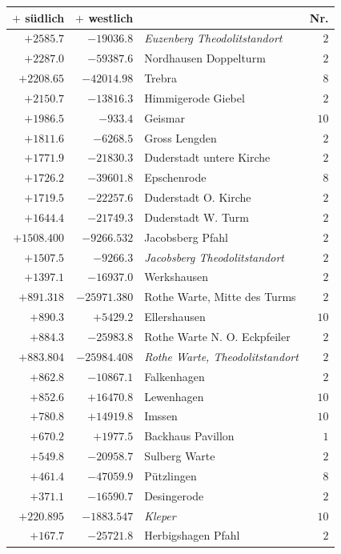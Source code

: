 \begin{center}\begingroup\fontsize{8}{9}\selectfont
\setlength{\tabcolsep}{4pt}
\begin{tabular}{r|r|p{170pt}|r}\hline
\(+\) südlich&\(+\) westlich&&Nr.\\\hline
\(+2585.7\)&\(-19036.8\)&\textit{Euzenberg Theodolitstandort}&\(2\)\\
\(+2287.0\)&\(-59387.6\)&Nordhausen Doppelturm&\(2\)\\
\(+2208.65\)&\(-42014.98\)&Trebra&\(8\)\\
\(+2150.7\)&\(-13816.3\)&Himmigerode Giebel&\(2\)\\
\(+1986.5\)&\(-933.4\)&Geismar&\(10\)\\
\(+1811.6\)&\(-6268.5\)&Gross Lengden&\(2\)\\
\(+1771.9\)&\(-21830.3\)&Duderstadt untere Kirche&\(2\)\\
\(+1726.2\)&\(-39601.8\)&Epschenrode&\(8\)\\
\(+1719.5\)&\(-22257.6\)&Duderstadt O. Kirche&\(2\)\\
\(+1644.4\)&\(-21749.3\)&Duderstadt W. Turm&\(2\)\\
\(+1508.400\)&\(-9266.532\)&Jacobsberg Pfahl&\(2\)\\
\(+1507.5\)&\(-9266.3\)&\textit{Jacobsberg Theodolitstandort}&\(2\)\\
\(+1397.1\)&\(-16937.0\)&Werkshausen&\(2\)\\
\(+891.318\)&\(-25971.380\)&Rothe Warte, Mitte des Turms&\(2\)\\
\(+890.3\)&\(+5429.2\)&Ellershausen&\(10\)\\
\(+884.3\)&\(-25983.8\)&Rothe Warte N. O. Eckpfeiler&\(2\)\\
\(+883.804\)&\(-25984.408\)&\textit{Rothe Warte, Theodolitstandort}&\(2\)\\
\(+862.8\)&\(-10867.1\)&Falkenhagen&\(2\)\\
\(+852.6\)&\(+16470.8\)&Lewenhagen&\(10\)\\
\(+780.8\)&\(+14919.8\)&Imssen&\(10\)\\
\(+670.2\)&\(+1977.5\)&Backhaus Pavillon&\(1\)\\
\(+549.8\)&\(-20958.7\)&Sulberg Warte&\(2\)\\
\(+461.4\)&\(-47059.9\)&Pützlingen&\(8\)\\
\(+371.1\)&\(-16590.7\)&Desingerode&\(2\)\\
\(+220.895\)&\(-1883.547\)&\textit{Kleper}&\(10\)\\
\(+167.7\)&\(-25721.8\)&Herbigshagen Pfahl&\(2\)\\

\end{tabular}
\end{center}
